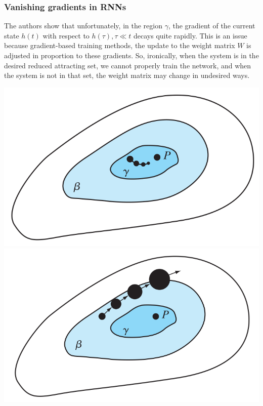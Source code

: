 \documentclass{beamer}
\begin{document}
\begin{frame}
  \frametitle{Vanishing gradients in RNNs}
  The authors show that unfortunately, in the region $\gamma$, the gradient of the current state $h(t)$ with respect to $h(\tau), \tau \ll t$ decays quite rapidly. This is an issue because gradient-based training methods, the update to the weight matrix $W$ is adjusted in proportion to these gradients. So, ironically, when the system is in the desired reduced attracting set, we cannot properly train the network, and when the system is not in that set, the weight matrix may change in undesired ways.
  
\begin{center}
\includegraphics[scale=0.20]{bengio_picture.png} \includegraphics[scale=0.20]{bengio_picture2.png}
\end{center}

\end{frame}
\end{document}
